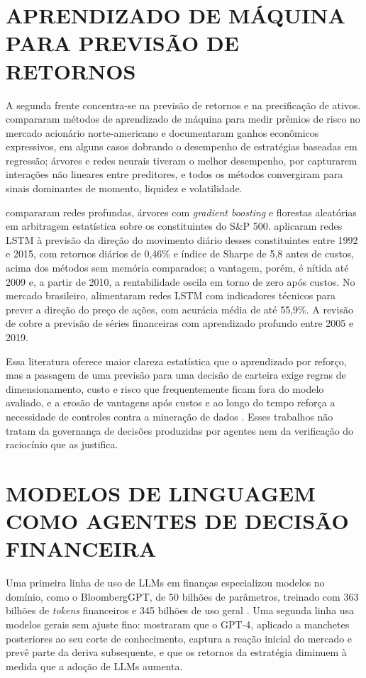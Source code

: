 \section{APRENDIZADO DE MÁQUINA PARA PREVISÃO DE RETORNOS}

A segunda frente concentra-se na previsão de retornos e na precificação de ativos. \citet{Gu2020} compararam métodos de aprendizado de máquina para medir prêmios de risco no mercado acionário norte-americano e documentaram ganhos econômicos expressivos, em alguns casos dobrando o desempenho de estratégias baseadas em regressão; árvores e redes neurais tiveram o melhor desempenho, por capturarem interações não lineares entre preditores, e todos os métodos convergiram para sinais dominantes de momento, liquidez e volatilidade.

\citet{Krauss2017} compararam redes profundas, árvores com \textit{gradient boosting} e florestas aleatórias em arbitragem estatística sobre os constituintes do S\&P 500. \citet{Fischer2018} aplicaram redes LSTM à previsão da direção do movimento diário desses constituintes entre 1992 e 2015, com retornos diários de 0,46\% e índice de Sharpe de 5,8 antes de custos, acima dos métodos sem memória comparados; a vantagem, porém, é nítida até 2009 e, a partir de 2010, a rentabilidade oscila em torno de zero após custos. No mercado brasileiro, \citet{Nelson2017} alimentaram redes LSTM com indicadores técnicos para prever a direção do preço de ações, com acurácia média de até 55,9\%. A revisão de \citet{Sezer2020} cobre a previsão de séries financeiras com aprendizado profundo entre 2005 e 2019.

Essa literatura oferece maior clareza estatística que o aprendizado por reforço, mas a passagem de uma previsão para uma decisão de carteira exige regras de dimensionamento, custo e risco que frequentemente ficam fora do modelo avaliado, e a erosão de vantagens após custos e ao longo do tempo \citep{Fischer2018} reforça a necessidade de controles contra a mineração de dados \citep{White2000, Hansen2005, LopezDePrado2018}. Esses trabalhos não tratam da governança de decisões produzidas por agentes nem da verificação do raciocínio que as justifica.

\section{MODELOS DE LINGUAGEM COMO AGENTES DE DECISÃO FINANCEIRA}

Uma primeira linha de uso de LLMs em finanças especializou modelos no domínio, como o BloombergGPT, de 50 bilhões de parâmetros, treinado com 363 bilhões de \textit{tokens} financeiros e 345 bilhões de uso geral \citep{Wu2023}. Uma segunda linha usa modelos gerais sem ajuste fino: \citet{LopezLira2023} mostraram que o GPT-4, aplicado a manchetes posteriores ao seu corte de conhecimento, captura a reação inicial do mercado e prevê parte da deriva subsequente, e que os retornos da estratégia diminuem à medida que a adoção de LLMs aumenta.

